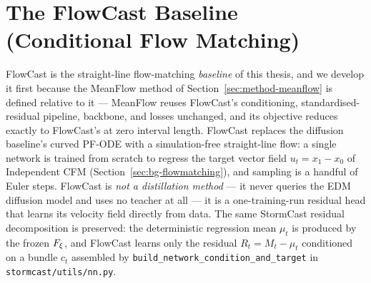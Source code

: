 \section{The FlowCast Baseline (Conditional Flow Matching)}
\label{sec:method-flowcast}

FlowCast is the straight-line flow-matching \emph{baseline} of this thesis, and we develop it first because the MeanFlow method of Section~\ref{sec:method-meanflow} is defined relative to it --- MeanFlow reuses FlowCast's conditioning, standardised-residual pipeline, backbone, and losses unchanged, and its objective reduces exactly to FlowCast's at zero interval length. FlowCast replaces the diffusion baseline's curved PF-ODE with a simulation-free straight-line flow: a single network is trained from scratch to regress the target vector field $u_t = x_1 - x_0$ of Independent CFM (Section~\ref{sec:bg-flowmatching}), and sampling is a handful of Euler steps. FlowCast is \emph{not a distillation method} --- it never queries the EDM diffusion model and uses no teacher at all --- it is a one-training-run residual head that learns its velocity field directly from data. The same StormCast residual decomposition is preserved: the deterministic regression mean $\mu_t$ is produced by the frozen $F_{\xi}$, and FlowCast learns only the residual $R_t = M_t - \mu_t$ conditioned on a bundle $c_t$ assembled by \texttt{build\_network\_condition\_and\_target} in \texttt{stormcast/utils/nn.py}.

